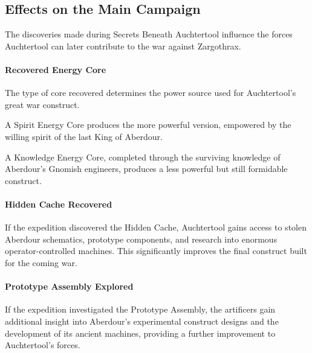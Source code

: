 \subsection*{Effects on the Main Campaign}
{\entryfont The discoveries made during Secrets Beneath Auchtertool influence the forces Auchtertool can later contribute to the war against Zargothrax.\\
\paragraph*{Recovered Energy Core} The type of core recovered determines the power source used for Auchtertool's great war construct.

A Spirit Energy Core produces the more powerful version, empowered by the willing spirit of the last King of Aberdour.

A Knowledge Energy Core, completed through the surviving knowledge of Aberdour's Gnomish engineers, produces a less powerful but still formidable construct.\\
\paragraph*{Hidden Cache Recovered} If the expedition discovered the Hidden Cache, Auchtertool gains access to stolen Aberdour schematics, prototype components, and research into enormous operator-controlled machines. This significantly improves the final construct built for the coming war.\\
\paragraph*{Prototype Assembly Explored} If the expedition investigated the Prototype Assembly, the artificers gain additional insight into Aberdour's experimental construct designs and the development of its ancient machines, providing a further improvement to Auchtertool's forces.}